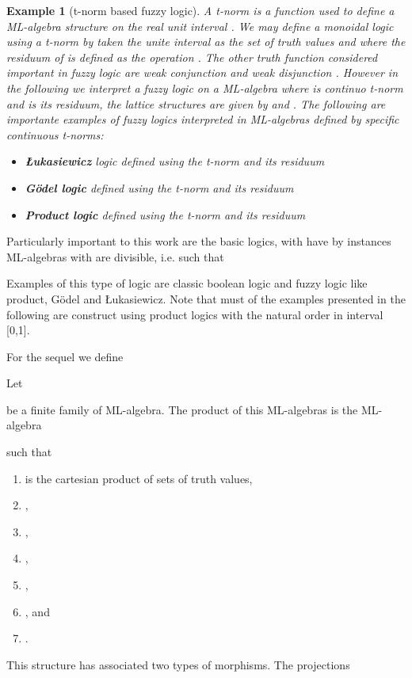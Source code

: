 \documentclass[oribibl]{llncs}
\newtheorem{exam}{Example}
\begin{document}
\begin{exam}[t-norm based fuzzy logic]
A t-norm is a function  used to define a ML-algebra structure on the real unit interval . We may define a monoidal logic using a t-norm by taken the unite interval as the set of truth values and where the residuum of  is defined as the operation . The other truth function considered important in fuzzy logic are \emph{weak conjunction}  and \emph{weak disjunction} . However in the following we interpret a fuzzy logic on a ML-algebra  where  is continuo t-norm and  is its residuum, the lattice structures are given by  and .
The following are importante examples of fuzzy logics interpreted in ML-algebras defined by specific continuous t-norms:
\begin{itemize}
  \item \textbf{{\L}ukasiewicz} logic defined using the t-norm  and its residuum 
  \item \textbf{G\"{o}del logic} defined using the t-norm  and its residuum 
  \item \textbf{Product logic} defined using the t-norm  and its residuum 
\end{itemize}
\end{exam}

Particularly important to this work are the basic logics, with have by instances ML-algebras with are divisible, i.e. such that

Examples of this type of logic are classic boolean logic and fuzzy logic like product, G\"{o}del and {\L}ukasiewicz. Note that must of the examples presented in the following are construct using product logics with the natural order in interval [0,1].

For the sequel we define


Let

be a finite family of ML-algebra. The product of this ML-algebras is the ML-algebra

such that
\begin{enumerate}
  \item  is the cartesian product of sets of truth values,
  \item ,
  \item ,
  \item ,
  \item  ,
  \item , and
  \item .
\end{enumerate}
This structure has associated two types of morphisms. The projections
\end{document}
